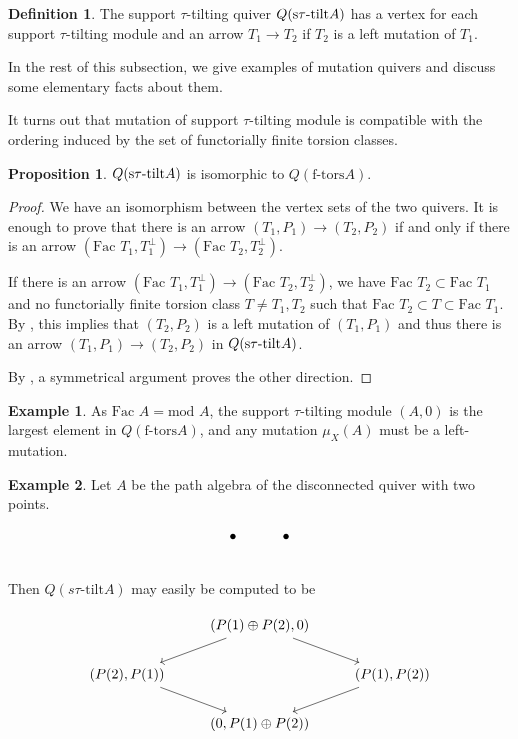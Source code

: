 \documentclass[]{article}
\theoremstyle{definition}
\newtheorem{definition}{Definition}[section]
\newtheorem{proposition}{Proposition}[section]
\newtheorem{example}{Example}[section]
\newcommand{\tu}{\ensuremath{\tau}}
\newcommand{\Fac}{\ensuremath{\text{Fac }}}
\begin{document}
\begin{definition}
	The support $\tau$-tilting quiver $Q(\text{s\tu-tilt} A)$ has a vertex for each support \tu-tilting module and an arrow $T_1 \to T_2$ if $T_2$ is a left mutation of $T_1$. 
\end{definition}

In the rest of this subsection, we give examples of mutation quivers and discuss some elementary facts about them.


It turns out that mutation of support \tu-tilting module is compatible with the ordering induced by the set of functorially finite torsion classes.
\begin{proposition}
	$Q(\text{s\tu-tilt} A)$ is isomorphic to $Q(\text{f-tors} A)$.
\end{proposition}

\begin{proof}
	We have an isomorphism between the vertex sets of the two quivers. It is enough to prove that there is an arrow $(T_1,P_1) \to (T_2,P_2)$ if and only if there is an arrow $(\Fac T_1,T_1^\perp) \to (\Fac T_2,T_2^\perp)$.
	
	If there is an arrow $(\Fac T_1,T_1^\perp) \to (\Fac T_2,T_2^\perp)$, we have $\Fac T_2 \subset \Fac T_1$ and no functorially finite torsion class $T \neq T_1,T_2$ such that $\Fac T_2 \subset T \subset \Fac T_1$. By \cite[Theorem 2.33]{tau}, this implies that $(T_2,P_2)$ is a left mutation of $(T_1,P_1)$ and thus there is an arrow $(T_1,P_1) \to (T_2,P_2)$ in $Q(\text{s\tu-tilt} A)$.
	
	By \cite[Theorem 2.33]{tau}, a symmetrical argument proves the other direction.	
\end{proof}

\begin{example}
	As $\Fac A=\text{mod } A$, the support \tu-tilting module $(A,0)$ is the largest element in $Q(\text{f-tors} A)$, and any mutation $\mu_X(A)$ must be a left-mutation.
\end{example}

\begin{example}
	Let $A$ be the path algebra of the disconnected quiver with two points.
	
	\[
	\begin{tikzcd}
	\bullet & \bullet   \\
	\end{tikzcd}
	\]
Then $Q(s\tau\text{-tilt} A)$ may easily be computed to be 

\[\begin{tikzcd}
& {(P(1)\oplus P(2),0)} \\
{(P(2),P(1))} && {(P(1),P(2))} \\
& {(0,P(1)\oplus P(2))}
\arrow[from=1-2, to=2-1]
\arrow[from=2-1, to=3-2]
\arrow[from=1-2, to=2-3]
\arrow[from=2-3, to=3-2]
\end{tikzcd}\]
\end{example}
\end{document}
